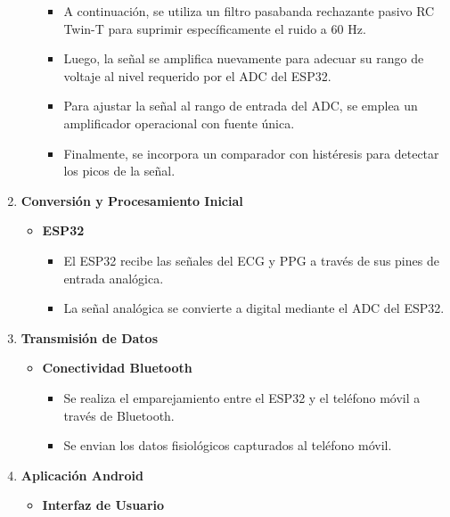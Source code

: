 \begin{enumerate}
\begin{itemize}
\begin{itemize}
                        \item A continuación, se utiliza un filtro pasabanda rechazante pasivo RC Twin-T para suprimir específicamente el ruido a 60 Hz.
                        \item Luego, la señal se amplifica nuevamente para adecuar su rango de voltaje al nivel requerido por el ADC del ESP32.
                        \item Para ajustar la señal al rango de entrada del ADC, se emplea un amplificador operacional con fuente única.
                        \item Finalmente, se incorpora un comparador con histéresis para detectar los picos de la señal.
                    \end{itemize}
            \end{itemize}
        \item \textbf{Conversión y Procesamiento Inicial}
            \begin{itemize}
                \item \textbf{ESP32}
                    \begin{itemize}
                        \item El ESP32 recibe las señales del ECG y PPG a través de sus pines de entrada analógica.
                        \item La señal analógica se convierte a digital mediante el ADC del ESP32.
                    \end{itemize}
            \end{itemize}
        \item \textbf{Transmisión de Datos}
            \begin{itemize}
                \item \textbf{Conectividad Bluetooth}
                    \begin{itemize}
                        \item Se realiza el emparejamiento entre el ESP32 y el teléfono móvil a través de Bluetooth.
                        \item Se envian los datos fisiológicos capturados al teléfono móvil.
                    \end{itemize}
            \end{itemize}
        \item \textbf{Aplicación Android}
            \begin{itemize}
                \item \textbf{Interfaz de Usuario}

\end{itemize}
\end{enumerate}
